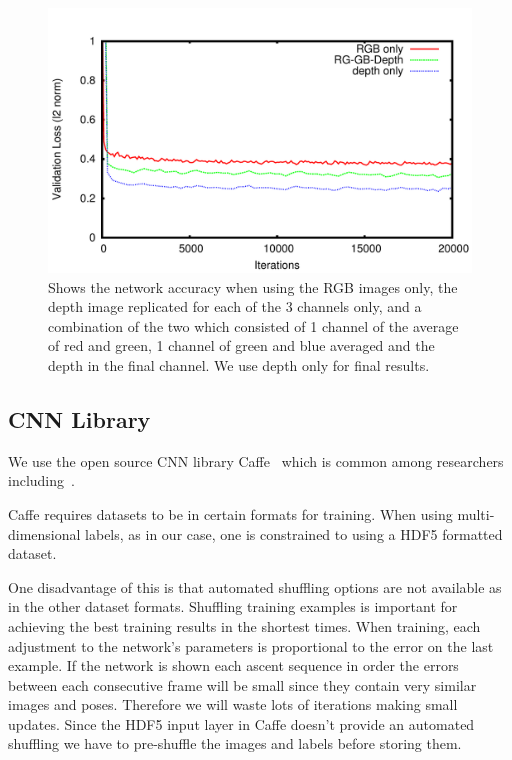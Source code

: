 \documentclass[11pt]{article} %
\begin{document}
\begin{figure}
\centering
\includegraphics*[width=0.8\linewidth,clip]{rgbComp.pdf} %
\caption{Shows the network accuracy when using the RGB images only, the depth image replicated for each of the 3 channels only, and a combination of the two which consisted of 1 channel of the average of red and green, 1 channel of green and blue averaged and the depth in the final channel. We use depth only for final results. }
\label{fig:rgbdcomp}
\end{figure}





\subsection{CNN Library}

We use the open source CNN library Caffe~\cite{Jia2014} which is common among researchers including~\cite{Chen, Pfister,Girshick2014,Springenberg2015,Schwarz2015,Simonyan2015,Wang2015}. 

Caffe requires datasets to be in certain formats for training. When using multi-dimensional labels, as in our case, one is constrained to using a HDF5 formatted~\cite{Folk2011} dataset. 

One disadvantage of this is that automated shuffling options are not available as in the other dataset formats. Shuffling training examples is important for achieving the best training results in the shortest times. When training, each adjustment to the network's parameters is proportional to the error on the last example. If the network is shown each ascent sequence in order the errors between each consecutive frame will be small since they contain very similar images and poses. Therefore we will waste lots of iterations making small updates. Since the HDF5 input layer in Caffe doesn't provide an automated shuffling we have to pre-shuffle the images and labels before storing them.
\end{document}
